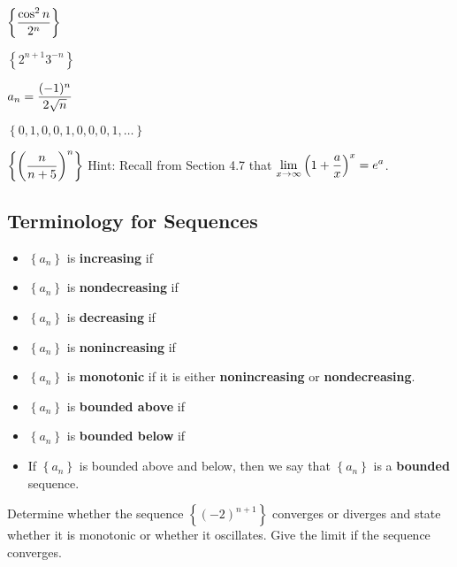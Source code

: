 \documentclass[12pt]{article}
\begin{document}
\vspace{5mm}

$\displaystyle\left\{\frac{\cos^2n}{2^n}\right\}$

\vfill

$\left\{2^{n+1} 3^{-n}\right\}$

\vfill

$a_n=\displaystyle\frac{(-1)^n}{2\sqrt{n}}$

\vfill

$\left\{0,1,0,0,1,0,0,0,1,\dots\right\}$

\vfill

\newpage
\Example $\displaystyle\left\{\left(\frac{n}{n+5}\right)^n\right\}$ \hfill Hint: Recall from Section 4.7 that $\displaystyle\lim_{x\to\infty}\left(1+\frac{a}{x}\right)^x=e^a$.
\vfill
\vfill
\vfill

\subsection*{Terminology for Sequences}
\begin{itemize}
	\item $\left\{a_n\right\}$ is \textbf{increasing} if
	
	\vfill
	
	\item $\left\{a_n\right\}$ is \textbf{nondecreasing} if
	\vfill

	\item $\left\{a_n\right\}$ is \textbf{decreasing} if
	\vfill

	\item $\left\{a_n\right\}$ is \textbf{nonincreasing} if
	\vfill

	\item $\left\{a_n\right\}$ is \textbf{monotonic} if it is either \textbf{nonincreasing} or \textbf{nondecreasing}.
	\vfill

	\item $\left\{a_n\right\}$ is \textbf{bounded above} if
	\vfill

	\item $\left\{a_n\right\}$ is \textbf{bounded below} if
	\vfill

	\item If $\left\{a_n\right\}$ is bounded above and below, then we say that $\left\{a_n\right\}$ is a \textbf{bounded} sequence.
	\vfill

\end{itemize}

\newpage

\Example Determine whether the sequence $\left\{ (-2)^{n+1} \right\}$ converges or diverges and state whether it is monotonic or whether it oscillates. Give the limit if the sequence converges.
\end{document}
